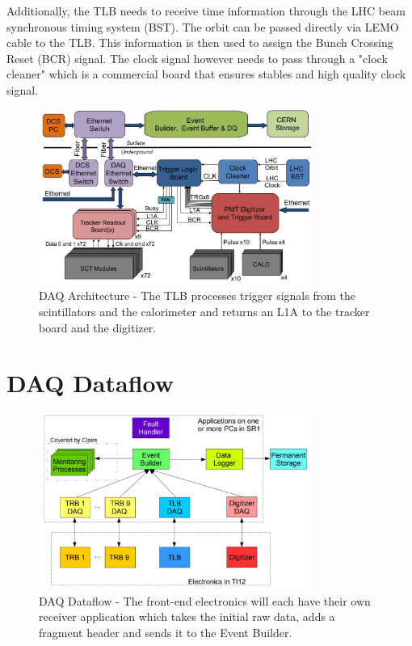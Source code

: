 Additionally, the TLB needs to receive time information through the LHC beam synchronous timing system (BST). The orbit can be passed directly via LEMO cable to the TLB. This information is then used to assign the Bunch Crossing Reset (BCR) signal. The clock signal however needs to pass through a "clock cleaner" which is a commercial board that ensures stables and high quality clock signal.

\begin{figure}[htbp!] 
\centering    
\includegraphics[width=0.8\textwidth]{ChapterDAQ/Figs/GeneralDAQ/Architecture.jpg}
\caption[DAQ Architecture]{DAQ Architecture - The TLB processes trigger signals from the scintillators and the calorimeter and returns an L1A to the tracker board and the digitizer.}
\label{fig:DAQArchitecture}
\end{figure}


\section{DAQ Dataflow}


\begin{figure}[htbp!] 
\centering    
\includegraphics[width=0.8\textwidth]{ChapterDAQ/Figs/GeneralDAQ/DAQDataFlow.jpg}
\caption[DAQ Dataflow]{DAQ Dataflow - The front-end electronics will each have their own receiver application which takes the initial raw data, adds a fragment header and sends it to the Event Builder.}
\label{fig:DAQDataFlow}
\end{figure}

